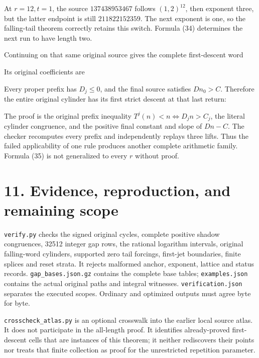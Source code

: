 At \(r=12,t=1\), the source \(137438953467\) follows \((1,2)^{12}\),
then exponent three, but the latter endpoint is still \(211822152359\).
The next exponent is one, so the falling-tail theorem correctly retains
this switch. Formula (34) determines the next run to have length two.

Continuing on that same original source gives the complete first-descent
word


Its original coefficients are


Every proper prefix has \(D_j\le0\), and the final source satisfies
\(Dn_0>C\). Therefore the entire original cylinder has its first strict
descent at that last return:


The proof is the original prefix inequality \(T^j(n)<n\iff D_jn>C_j\),
the literal cylinder congruence, and the positive final constant and
slope of \(Dn-C\). The checker recomputes every prefix and independently
replays three lifts. Thus the failed applicability of one rule produces
another complete arithmetic family. Formula (35) is not generalized to
every \(r\) without proof.

\section{11. Evidence, reproduction, and remaining scope}

\nolinkurl{verify.py} checks the signed original cycles, complete
positive shadow congruences, 32512 integer gap rows, the rational
logarithm intervals, original falling-word cylinders, supported zero
tail forcings, first-jet boundaries, finite splices and reset strata. It
rejects malformed anchor, exponent, lattice and status records.
\nolinkurl{gap_bases.json.gz} contains the complete base tables;
\nolinkurl{examples.json} contains the actual original paths and
integral witnesses. \nolinkurl{verification.json} separates the executed
scopes. Ordinary and optimized outputs must agree byte for byte.

\nolinkurl{crosscheck_atlas.py} is an optional crosswalk into the
earlier local source atlas. It does not participate in the all-length
proof. It identifies already-proved first-descent cells that are
instances of this theorem; it neither rediscovers their points nor
treats that finite collection as proof for the unrestricted repetition
parameter.

